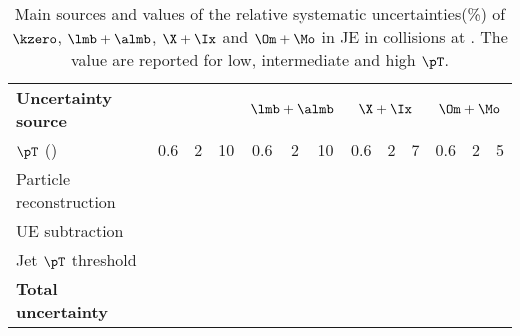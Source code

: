 \begin{table}[!ht]
	\begin{center}
		\caption{Main sources and values of the relative systematic uncertainties(\%) of $\kzero$,  $\lmb + \almb$, $\X + \Ix$ and $\Om + \Mo$ in JE in \pPb collisions at \fivenn.
			The value are reported for low, intermediate and high $\pT$.}
		\label{tab:pPbJEUncer}
		\begin{tabularx}{\textwidth}{@{} lCCCCCCCCCCCC @{}}
			\toprule
			\textbf{Uncertainty source} & 
			& 
			& 
			&  \\
			\cmidrule(lr){2-4}  \cmidrule(lr){5-7} \cmidrule(lr){8-10} \cmidrule(lr){11-13}
			$\pT$ (\GeVc) & 0.6 & 2 &10   & 0.6 & 2 & 10     & 0.6 & 2 & 7    & 0.6& 2 & 5 \\
			\midrule
			Particle reconstruction\\
			UE subtraction\\
			Jet $\pT$ threshold\\
			\midrule
			\textbf{Total uncertainty} \\
			\bottomrule
		\end{tabularx}
	\end{center}
\end{table}
